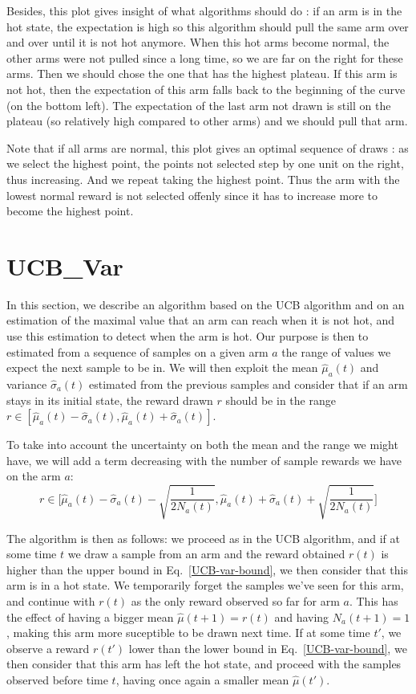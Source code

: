 \documentclass{article} %
\begin{document}
Besides, this plot gives insight of what algorithms should do : if an arm is in the hot state, the expectation is high so this algorithm should pull the same arm over and over until it is not hot anymore. When this hot arms become normal, the other arms were not pulled since a long time, so we are far on the right for these arms. Then we should chose the one that has the highest plateau. If this arm is not hot, then the expectation of this arm falls back to the beginning of the curve (on the bottom left). The expectation of the last arm not drawn is still on the plateau (so relatively high compared to other arms) and we should pull that arm.

Note that if all arms are normal, this plot gives an optimal sequence of draws : as we select the highest point, the points not selected step by one unit on the right, thus increasing. And we repeat taking the highest point. Thus the arm with the lowest normal reward is not selected offenly since it has to increase more to become the highest point.

\section{UCB\_Var}

In this section, we describe an algorithm based on the UCB algorithm and on an estimation of the maximal
value that an arm can reach when it is not hot, and use this estimation to detect when the
arm is hot. Our purpose is then to estimated from a sequence of samples on a given arm $a$ the range
of values we expect the next sample to be in. We will then exploit the mean $\hat\mu_a(t)$ and variance $\hat\sigma_a(t)$
estimated from the previous samples and consider that if an arm stays in its initial
state, the reward drawn $r$ should be in the range $r \in [\hat\mu_a(t)-\hat\sigma_a(t), \hat\mu_a(t)+\hat\sigma_a(t)]$.

To take into account the uncertainty on both the mean and the range we might have,
we will add a term decreasing with the number of sample rewards we have on the arm $a$:
\begin{equation}\label{UCB-var-bound}
	r \in \Big[\hat\mu_a(t)-\hat\sigma_a(t)-\sqrt{\frac{1}{2N_a(t)}}, \hat\mu_a(t)+\hat\sigma_a(t)+\sqrt{\frac{1}{2N_a(t)}}\Big]
\end{equation}

The algorithm is then as follows: we proceed as in the UCB algorithm, and if at
some time $t$ we draw a sample from an arm and the reward obtained $r(t)$ is higher than the upper bound
in Eq.~\ref{UCB-var-bound}, we then consider that this arm is in a hot state.
We temporarily forget the samples we've seen for this arm, and continue
with $r(t)$ as the only reward observed so far for arm $a$. This has the effect
of having a bigger mean $\hat\mu(t+1) = r(t)$ and having $N_a(t+1) = 1$, making this arm more suceptible
to be drawn next time. If at some time $t'$, we observe a reward $r(t')$ lower
than the lower bound in Eq.~\ref{UCB-var-bound}, we then consider that this arm has
left the hot state, and proceed with the samples observed before time $t$, having
once again a smaller mean $\hat\mu(t')$.
\end{document}
